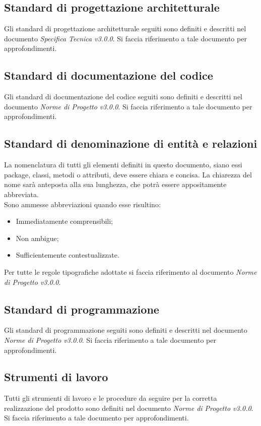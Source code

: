 \subsection{Standard di progettazione architetturale}
Gli standard di progettazione architetturale seguiti sono definiti e descritti nel documento \textit{Specifica Tecnica v3.0.0}. Si faccia riferimento a tale
documento per approfondimenti.

\subsection{Standard di documentazione del codice}
Gli standard di documentazione del codice seguiti sono definiti e descritti nel documento \textit{Norme di Progetto v3.0.0}. Si faccia riferimento a tale
documento per approfondimenti.

\subsection{Standard di denominazione di entità e relazioni}
La nomenclatura di tutti gli elementi definiti in questo documento, siano essi package, classi, metodi o attributi, deve essere chiara e concisa. 
La chiarezza del nome sarà anteposta alla sua lunghezza, che potrà essere appositamente abbreviata. \\
\noindent Sono ammesse abbreviazioni quando esse risultino:
\begin{itemize}
	 \item Immediatamente comprensibili;
	 \item Non ambigue;
	 \item Sufficientemente contestualizzate.
\end{itemize}
Per tutte le regole tipografiche adottate si faccia riferimento al documento \textit{Norme di Progetto v3.0.0}.

\subsection{Standard di programmazione}
Gli standard di programmazione seguiti sono definiti e descritti nel documento \textit{Norme di Progetto v3.0.0}. Si faccia riferimento a tale
documento per approfondimenti.

\subsection{Strumenti di lavoro}
Tutti gli strumenti di lavoro e le procedure da seguire per la corretta realizzazione del prodotto sono definiti nel documento \textit{Norme di Progetto v3.0.0}.
Si faccia riferimento a tale documento per approfondimenti.

